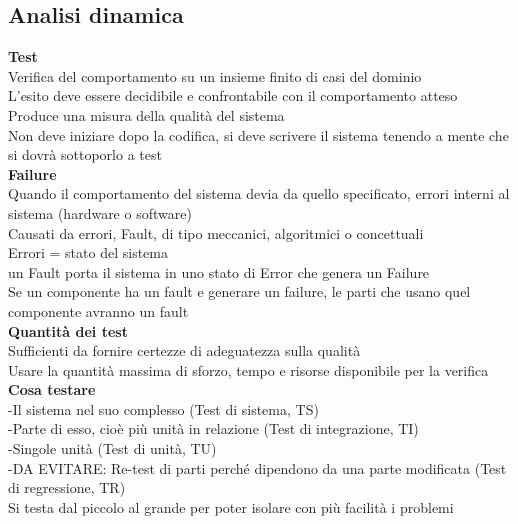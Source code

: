 \documentclass{article}
\begin{document}
				\subsection{Analisi dinamica}
				\textbf{Test}\\
				Verifica del comportamento su un insieme finito di casi del dominio\\
				L'esito deve essere decidibile e confrontabile con il comportamento atteso\\
				Produce una misura della qualità del sistema\\
				Non deve iniziare dopo la codifica, si deve scrivere il sistema tenendo a mente che si dovrà sottoporlo a test\\
				
				\textbf{Failure}\\
				Quando il comportamento del sistema devia da quello specificato, errori interni al sistema (hardware o software)\\
				Causati da errori, Fault, di tipo meccanici, algoritmici o concettuali\\
				Errori = stato del sistema\\
				un Fault porta il sistema in uno stato di Error che genera un Failure\\
				Se un componente ha un fault e generare un failure, le parti che usano quel componente avranno un fault\\
				
				\textbf{Quantità dei test}\\
				Sufficienti da fornire certezze di adeguatezza sulla qualità\\
				Usare la quantità massima di sforzo, tempo e risorse disponibile per la verifica\\
				
				\textbf{Cosa testare}\\
				-Il sistema nel suo complesso (Test di sistema, TS)\\
				-Parte di esso, cioè più unità in relazione (Test di integrazione, TI)\\
				-Singole unità (Test di unità, TU)\\
				-DA EVITARE: Re-test di parti perché dipendono da una parte modificata (Test di regressione, TR)\\
				Si testa dal piccolo al grande per poter isolare con più facilità i problemi\\
				
\end{document}
